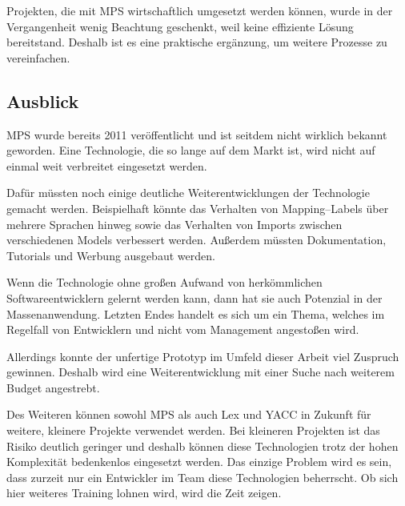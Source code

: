 Projekten, die mit \ac{MPS} wirtschaftlich umgesetzt werden können, wurde in der Vergangenheit wenig Beachtung geschenkt, weil keine effiziente Lösung bereitstand.
Deshalb ist es eine praktische ergänzung, um weitere Prozesse zu vereinfachen.

\subsection{Ausblick}\label{subsec:ausblick}
\ac{MPS} wurde bereits 2011 veröffentlicht und ist seitdem nicht wirklich bekannt geworden. %
Eine Technologie, die so lange auf dem Markt ist, wird nicht auf einmal weit verbreitet eingesetzt werden.

Dafür müssten noch einige deutliche Weiterentwicklungen der Technologie gemacht werden.
Beispielhaft könnte das Verhalten von Mapping--Labels über mehrere Sprachen hinweg sowie das Verhalten von Imports zwischen verschiedenen Models verbessert werden.
Außerdem müssten Dokumentation, Tutorials und Werbung ausgebaut werden.

Wenn die Technologie ohne großen Aufwand von herkömmlichen Softwareentwicklern gelernt werden kann, dann hat sie auch Potenzial in der Massenanwendung.
Letzten Endes handelt es sich um ein Thema, welches im Regelfall von Entwicklern und nicht vom Management angestoßen wird.

Allerdings konnte der unfertige Prototyp im Umfeld dieser Arbeit viel Zuspruch gewinnen.
Deshalb wird eine Weiterentwicklung mit einer Suche nach weiterem Budget angestrebt.

Des Weiteren können sowohl \ac{MPS} als auch Lex und \ac{YACC} in Zukunft für weitere, kleinere Projekte verwendet werden.
Bei kleineren Projekten ist das Risiko deutlich geringer und deshalb können diese Technologien trotz der hohen Komplexität bedenkenlos eingesetzt werden.
Das einzige Problem wird es sein, dass zurzeit nur ein Entwickler im Team diese Technologien beherrscht.
Ob sich hier weiteres Training lohnen wird, wird die Zeit zeigen.